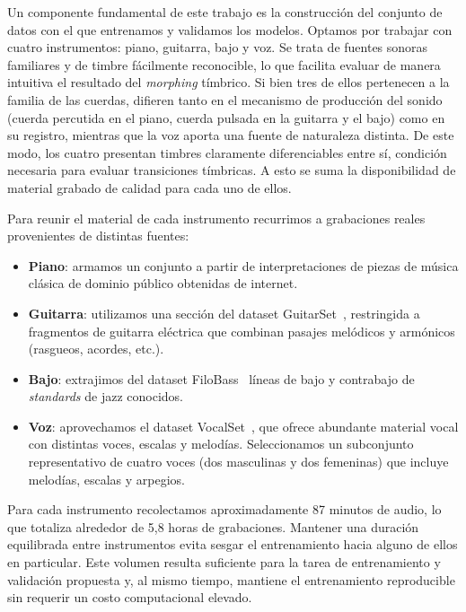 \documentclass[12pt,a4paper,twoside]{tesis}
\begin{document}
Un componente fundamental de este trabajo es la construcción del conjunto de datos con el que entrenamos y validamos los modelos. Optamos por trabajar con cuatro instrumentos: piano, guitarra, bajo y voz. Se trata de fuentes sonoras familiares y de timbre fácilmente reconocible, lo que facilita evaluar de manera intuitiva el resultado del \emph{morphing} tímbrico. Si bien tres de ellos pertenecen a la familia de las cuerdas, difieren tanto en el mecanismo de producción del sonido (cuerda percutida en el piano, cuerda pulsada en la guitarra y el bajo) como en su registro, mientras que la voz aporta una fuente de naturaleza distinta. De este modo, los cuatro presentan timbres claramente diferenciables entre sí, condición necesaria para evaluar transiciones tímbricas. A esto se suma la disponibilidad de material grabado de calidad para cada uno de ellos.

Para reunir el material de cada instrumento recurrimos a grabaciones reales provenientes de distintas fuentes:

\begin{itemize}
    \item \textbf{Piano}: armamos un conjunto a partir de interpretaciones de piezas de música clásica de dominio público obtenidas de internet.
    \item \textbf{Guitarra}: utilizamos una sección del dataset GuitarSet~\cite{xi2019guitarset}, restringida a fragmentos de guitarra eléctrica que combinan pasajes melódicos y armónicos (rasgueos, acordes, etc.).
    \item \textbf{Bajo}: extrajimos del dataset FiloBass~\cite{riley2023filobass} líneas de bajo y contrabajo de \textit{standards} de jazz conocidos.
    \item \textbf{Voz}: aprovechamos el dataset VocalSet~\cite{wilkins2018vocalset}, que ofrece abundante material vocal con distintas voces, escalas y melodías. Seleccionamos un subconjunto representativo de cuatro voces (dos masculinas y dos femeninas) que incluye melodías, escalas y arpegios.
\end{itemize}

Para cada instrumento recolectamos aproximadamente 87 minutos de audio, lo que totaliza alrededor de 5,8 horas de grabaciones. Mantener una duración equilibrada entre instrumentos evita sesgar el entrenamiento hacia alguno de ellos en particular. Este volumen resulta suficiente para la tarea de entrenamiento y validación propuesta y, al mismo tiempo, mantiene el entrenamiento reproducible sin requerir un costo computacional elevado.
\end{document}
